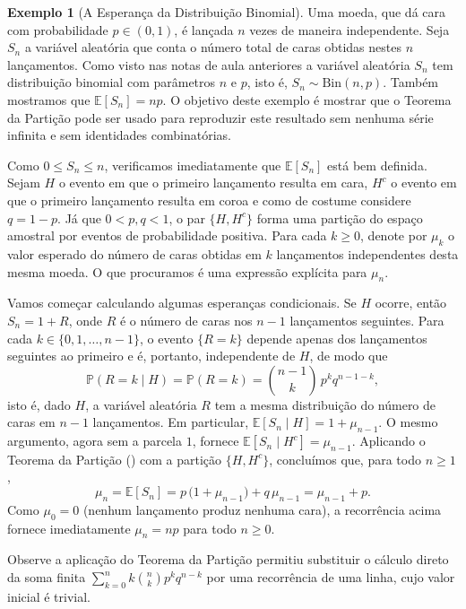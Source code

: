 \documentclass[12pt,portuguese]{article}
\theoremstyle{definition}
\newtheorem{example}[example]{Exemplo}
\begin{document}
\begin{example}[A Esperança da Distribuição Binomial]\label{ex:binomial-particao}
Uma moeda, que dá cara com probabilidade \(p \in (0,1)\), é lançada \(n\)
vezes de maneira independente. Seja \(S_n\) a variável aleatória
que conta o número total de caras obtidas nestes $n$ lançamentos. 
Como visto nas notas de aula anteriores a variável aleatória \(S_n\)
tem distribuição binomial com parâmetros \(n\) e \(p\), isto é,
$S_n\sim \mathrm{Bin}(n,p)$. Também mostramos que
\(\mathbb{E}[S_n] = np\). O objetivo deste exemplo é mostrar que o Teorema da
Partição pode ser usado para reproduzir este resultado sem nenhuma 
série infinita e sem identidades combinatórias.

Como \(0 \leqslant S_n \leqslant n\), verificamos imediatamente que \(\mathbb{E}[S_n]\) está bem
definida. Sejam \(H\) o evento em que o primeiro lançamento resulta em cara,
\(H^c\) o evento em que o primeiro lançamento resulta em coroa e como de costume
considere \(q = 1 - p\). Já que 
\(0 < p, q < 1\), o par \(\{H, H^c\}\) forma uma partição do espaço amostral
por eventos de probabilidade positiva. Para cada \(k \geqslant 0\), denote por
\(\mu_k\) o valor esperado do número de caras obtidas em \(k\) lançamentos
independentes desta mesma moeda. O que procuramos é uma expressão explícita 
para \(\mu_n\).

\medskip 

Vamos começar calculando algumas esperanças condicionais. Se \(H\) ocorre, então
\(S_n = 1 + R\), onde \(R\) é o número de caras nos \(n-1\) lançamentos
seguintes. Para cada \(k \in \{0, 1, \ldots, n-1\}\), o evento \(\{R = k\}\)
depende apenas dos lançamentos seguintes ao primeiro e é, portanto,
independente de \(H\), de modo que
\[
\mathbb{P}(R = k \mid H)
= \mathbb{P}(R = k)
= \binom{n-1}{k}\,p^{k}q^{n-1-k},
\]
isto é, dado \(H\), a variável aleatória \(R\) tem a mesma distribuição do número de
caras em \(n-1\) lançamentos. Em particular,
\(\mathbb{E}[S_n \mid H] = 1 + \mu_{n-1}\). O mesmo argumento, agora sem a
parcela \(1\), fornece \(\mathbb{E}[S_n \mid H^c] = \mu_{n-1}\). Aplicando o
Teorema da Partição () com a partição
\(\{H, H^c\}\), concluímos que, para todo \(n \geqslant 1\),
\[
\mu_n
= \mathbb{E}[S_n]
= p\,\bigl(1 + \mu_{n-1}\bigr) + q\,\mu_{n-1}
= \mu_{n-1} + p.
\]
Como \(\mu_0 = 0\) (nenhum lançamento produz nenhuma cara), a
recorrência acima fornece imediatamente \(\mu_n = np\) para todo
\(n \geqslant 0\).

Observe a aplicação do Teorema da Partição permitiu substituir o cálculo direto da soma
finita \(\sum_{k=0}^{n} k\binom{n}{k}p^{k}q^{n-k}\) por uma
recorrência de uma linha, cujo valor inicial é trivial.
\end{example}
\end{document}
